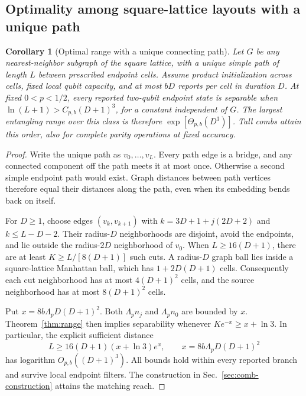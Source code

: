 \documentclass[aps,prl,twocolumn,superscriptaddress,longbibliography,reprint,floatfix]{revtex4-2}
\newtheorem{corollary}{Corollary}
\begin{document}
\subsection{Optimality among square-lattice layouts with a unique path}
\label{sec:square-unique-path}
\begin{corollary}[Optimal range with a unique connecting path]
Let $G$ be any nearest-neighbor subgraph of the square lattice, with a
unique simple path of length $L$ between prescribed endpoint cells.
Assume product initialization across cells, fixed local qubit capacity,
and at most $bD$ reports per cell in duration $D$. At fixed
$0<p<1/2$, every reported two-qubit endpoint state is separable when
$\ln(L+1)>C_{p,b}(D+1)^3$, for a constant independent of $G$.
The largest entangling range over this class is therefore
$\exp[\Theta_{p,b}(D^3)]$. Tall combs attain this order, also for
complete parity operations at fixed accuracy.
\end{corollary}

\begin{proof}
Write the unique path as $v_0,\ldots,v_L$. Every path edge is a bridge,
and any connected component off the path meets it at most once.
Otherwise a second simple endpoint path would exist. Graph distances
between path vertices therefore equal their distances along the path,
even when its embedding bends back on itself.

For $D\ge1$, choose edges $(v_k,v_{k+1})$ with
$k=3D+1+j(2D+2)$ and $k\le L-D-2$. Their radius-$D$ neighborhoods
are disjoint, avoid the endpoints, and lie outside the radius-$2D$
neighborhood of $v_0$. When $L\ge16(D+1)$, there are at least
$K\ge L/[8(D+1)]$ such cuts. A radius-$D$ graph ball lies inside a
square-lattice Manhattan ball, which has $1+2D(D+1)$ cells.
Consequently each cut neighborhood has at most $4(D+1)^2$ cells,
and the source neighborhood has at most $8(D+1)^2$ cells.

Put $x=8b\Lambda_pD(D+1)^2$. Both $\Lambda_p n_j$ and
$\Lambda_p n_0$ are bounded by $x$. Theorem~\ref{thm:range} then
implies separability whenever $Ke^{-x}\ge x+\ln3$. In particular,
the explicit sufficient distance
\begin{equation}
 L\ge16(D+1)(x+\ln3)e^x,
 \qquad x=8b\Lambda_pD(D+1)^2
 \label{eq:square-unique-path-range}
\end{equation}
has logarithm $O_{p,b}((D+1)^3)$. All bounds hold within every
reported branch and survive local endpoint filters. The construction in Sec.~\ref{sec:comb-construction} attains the matching reach.
\end{proof}
\end{document}
